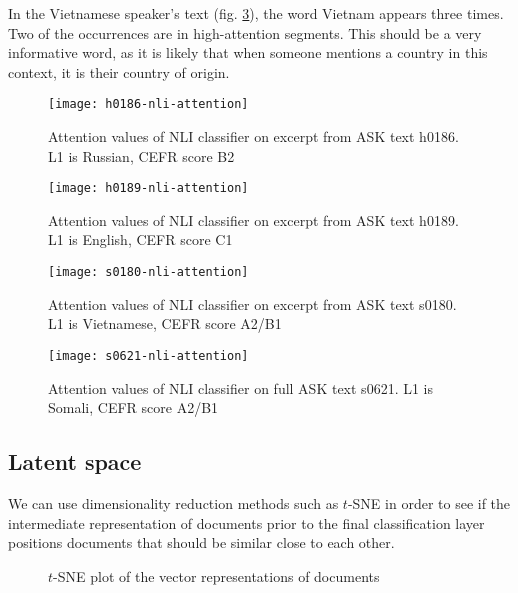 In the Vietnamese speaker's text (fig. \ref{fig:s0180-nli-attention}), the
word Vietnam appears three times. Two of the occurrences are in high-attention
segments. This should be a very informative word, as it is likely that when
someone mentions a country in this context, it is their country of origin.

\begin{figure}
  \centering
  \texttt{[image: h0186-nli-attention]}
  \caption{Attention values of NLI classifier on excerpt from ASK text h0186.
           L1 is Russian, CEFR score B2}
  \label{fig:h0186-nli-attention}
\end{figure}

\begin{figure}
  \centering
  \texttt{[image: h0189-nli-attention]}
  \caption{Attention values of NLI classifier on excerpt from ASK text h0189.
           L1 is English, CEFR score C1}
  \label{fig:h0189-nli-attention}
\end{figure}

\begin{figure}
  \centering
  \texttt{[image: s0180-nli-attention]}
  \caption{Attention values of NLI classifier on excerpt from ASK text s0180.
           L1 is Vietnamese, CEFR score A2/B1}
  \label{fig:s0180-nli-attention}
\end{figure}

\begin{figure}
  \centering
  \texttt{[image: s0621-nli-attention]}
  \caption{Attention values of NLI classifier on full ASK text s0621.
           L1 is Somali, CEFR score A2/B1}
  \label{fig:s0621-nli-attention}
\end{figure}


\subsection{Latent space}

We can use dimensionality reduction methods such as $t$-SNE in order to see
if the intermediate representation of documents prior to the final
classification layer positions documents that should be similar close to each
other.

\begin{figure}
  \centering
  \caption{$t$-SNE plot of the vector representations of documents}
  \label{fig:cefr-t-sne}
\end{figure}
